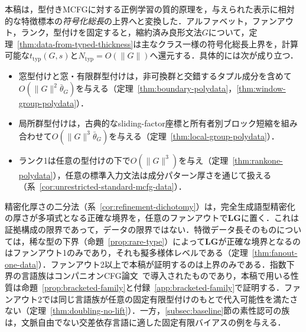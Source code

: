 本稿は，型付きMCFGに対する正例学習の質的原理を，与えられた表示に相対的な特徴標本の\emph{符号化総長}の上界へと変換した．アルファベット，ファンアウト，ランク，型付けを固定すると，縮約済み良形文法$G$について，定理~\ref{thm:data-from-typed-thickness}は主なクラス一様の符号化総長上界を，計算可能な$t_{\mathrm{typ}}(G,s)$と$N_{\mathrm{typ}}=O(\|G\|)$へ還元する．具体的には次が成り立つ．
\begin{itemize}[leftmargin=*]
\item 窓型付けと窓・有限群型付けは，非可換群と交錯するタプル成分を含めて$O(\|G\|^2\bar\theta_G)$を与える（定理~\ref{thm:boundary-polydata}，\ref{thm:window-group-polydata}）．
\item 局所群型付けは，古典的なsliding-factor座標と所有者別ブロック短縮を組み合わせて$O(\|G\|^3\bar\theta_G)$を与える（定理~\ref{thm:local-group-polydata}）．
\item ランク1は任意の型付けの下で$O(\|G\|^3)$を与え（定理~\ref{thm:rankone-polydata}），任意の標準入力文法は成分パターン厚さを通じて扱える（系~\ref{cor:unrestricted-standard-mcfg-data}）．
\end{itemize}
精密化厚さの二分法（系~\ref{cor:refinement-dichotomy}）は，完全生成語型精密化の厚さが多項式となる正確な境界を，任意のファンアウトで$\mathbf{LG}$に置く．これは証拠構成の限界であって，データの限界ではない．特徴データ長そのものについては，稀な型の下界（命題~\ref{prop:rare-type}）によって$\mathbf{LG}$が正確な境界となるのはファンアウト1のみであり，それも擬多様体レベルである（定理~\ref{thm:fanout-one-data}）．ファンアウト2以上で本稿が証明するのは上界のみである．指数下界の言語族はコンパニオンCFG論文~\cite[Proposition~6.4]{kuriyamaCFG}で導入されたものであり，本稿で用いる性質は命題~\ref{prop:bracketed-family}と付録~\ref{app:bracketed-family}で証明する．ファンアウト2では同じ言語族が任意の固定有限型付けのもとで代入可能性を満たさない（定理~\ref{thm:doubling-no-lift}）．一方，\ref{subsec:baseline}節の素性認可の族は，文脈自由でない交差依存言語に適した固定有限バイアスの例を与える．

